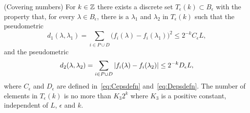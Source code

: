 \documentclass[journal]{IEEEtran}
\begin{document}
\begin{lemma}\label{lem:metricentropy}(Covering numbers)
For $k \in {\mathbb Z}$ there exists a discrete set $T_\epsilon(k) \subset B_\epsilon$ with the property that, for every $\lambda \in B_\epsilon$, there is a $\lambda_1$ and $\lambda_2$ in $T_\epsilon(k)$ such that the pseudometric
\[
d_1(\lambda, \lambda_1) = \sum_{i \in P \cup D} \big( f_{i}(\lambda) - f_{i}(\lambda_1) \big)^2 \leq 2^{-k} C_\epsilon L,
\]
and the pseudometric
\[
d_2(\lambda, \lambda_2) = \sum_{i \in P \cup D} {\vert f_{i}(\lambda) - f_{i}(\lambda_2) \vert} \leq 2^{-k} D_\epsilon L,
\]
where $C_\epsilon$ and $D_\epsilon$ are defined in~\eqref{eq:Cepsdefn} and~\eqref{eq:Depsdefn}.  The number of elements in $T_\epsilon(k)$ is no more than $K_3 2^{k}$ where $K_3$ is a positive constant, independent of $L$, $\epsilon$ and $k$.
\end{lemma}
\end{document}
